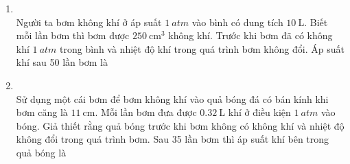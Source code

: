 \begin{enumerate}[label=\bfseries Câu \arabic*:, leftmargin=1.7cm]
\item {}\\
Người ta bơm không khí ở áp suất $\SI{1}{atm}$ vào bình có dung tích $\SI{10}{\liter}$. Biết mỗi lần bơm thì bơm được $\SI{250}{\centi\meter^3}$ không khí. Trước khi bơm đã có không khí $\SI{1}{atm}$ trong bình và nhiệt độ khí trong quá trình bơm không đổi. Áp suất khí sau 50 lần bơm là

\item {}\\
Sử dụng một cái bơm để bơm không khí vào quả bóng đá có bán kính khi bơm căng là $\SI{11}{\centi\meter}$. Mỗi lần bơm đưa được $\SI{0.32}{\liter}$ khí ở điều kiện $\SI{1}{atm}$ vào bóng. Giả thiết rằng quả bóng trước khi bơm không có không khí và nhiệt độ không đổi trong quá trình bơm. Sau 35 lần bơm thì áp suất khí bên trong quả bóng là


\end{enumerate}
